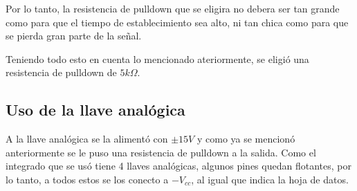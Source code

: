 \documentclass[../../ASSD_TP1_G7.tex]{subfiles}
\begin{document}
Por lo tanto, la resistencia de pulldown que se eligira no debera ser tan grande como para que el tiempo de establecimiento sea alto, ni tan chica como para que se pierda gran parte de la señal.

Teniendo todo esto en cuenta lo mencionado ateriormente, se eligió una resistencia de pulldown de $5k\Omega$.
\subsection*{Uso de la llave analógica}
A la llave analógica se la alimentó con $\pm15V$ y como ya se mencionó anteriormente se le puso una resistencia de pulldown a la salida. Como el integrado que se usó tiene 4 llaves analógicas, algunos pines quedan flotantes, por lo tanto, a todos estos se los conecto a $-V_{cc}$, al igual que indica la hoja de datos.
\end{document}
